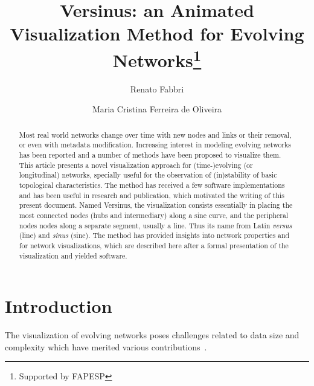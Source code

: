 \documentclass[runningheads]{llncs}
\begin{document}
%
\title{Versinus: an Animated Visualization Method for Evolving Networks\thanks{Supported by FAPESP}}
%
%
\author{Renato Fabbri \and
Maria Cristina Ferreira de Oliveira}
%
%
%
\maketitle              %
%
\begin{abstract}
Most real world networks change over time with new nodes and links or their removal, or even with metadata modification.
Increasing interest in modeling evolving networks has been reported and
a number of methods have been proposed to visualize them.  
  This article presents a novel visualization approach for (time-)evolving (or longitudinal) networks,
  specially useful for the observation of (in)stability of basic topological characteristics.
  The method has received a few software implementations and has been useful in research and publication, which motivated the writing of this present document.
  Named Versinus, the visualization consists essentially in placing the most connected nodes (hubs and intermediary) along a sine curve, and the peripheral nodes nodes along a separate segment, usually a line.
  Thus its name from  Latin \emph{versus} (line) and \emph{sinus} (sine).
  The method has provided insights into network properties and for network visualizations, which are described here after a formal presentation of the visualization and yielded software.


\end{abstract}
%
%
%
\section{Introduction}
The visualization of evolving networks poses challenges related to data size and complexity which have merited various contributions~\cite{evo1,evo2,evo3}.
\end{document}
